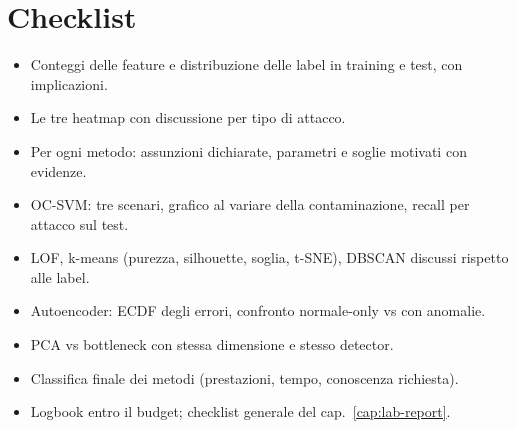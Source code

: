 \section{Checklist}
\begin{itemize}
  \item[$\square$] Conteggi delle feature e distribuzione delle label in training e test, con implicazioni.
  \item[$\square$] Le tre heatmap con discussione per tipo di attacco.
  \item[$\square$] Per ogni metodo: assunzioni dichiarate, parametri e soglie motivati con evidenze.
  \item[$\square$] OC-SVM: tre scenari, grafico al variare della contaminazione, recall per attacco sul test.
  \item[$\square$] LOF, k-means (purezza, silhouette, soglia, t-SNE), DBSCAN discussi rispetto alle label.
  \item[$\square$] Autoencoder: ECDF degli errori, confronto normale-only vs con anomalie.
  \item[$\square$] PCA vs bottleneck con stessa dimensione e stesso detector.
  \item[$\square$] Classifica finale dei metodi (prestazioni, tempo, conoscenza richiesta).
  \item[$\square$] Logbook entro il budget; checklist generale del cap.~\ref{cap:lab-report}.
\end{itemize}
